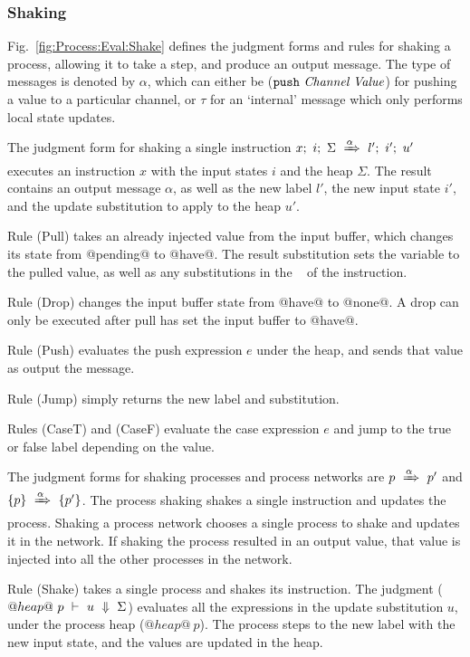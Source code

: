 \subsubsection{Shaking}
Fig.~\ref{fig:Process:Eval:Shake} defines the judgment forms and rules for shaking a process, allowing it to take a step, and produce an output message.
The type of messages is denoted by $\alpha$, which can either be ($\texttt{push}~\textit{Channel}~\textit{Value}$) for pushing a value to a particular channel, or $\tau$ for an `internal' message which only performs local state updates.


The judgment form for shaking a single instruction $x;~i;~\Sigma~\xRightarrow{\alpha}~l';~i';~u'$
executes an instruction $x$ with the input states $i$ and the heap $\Sigma$.
The result contains an output message $\alpha$, as well as the new label $l'$, the new input state $i'$, and the update substitution to apply to the heap $u'$.

Rule (Pull) takes an already injected value from the input buffer, which changes its state from @pending@ to @have@.
The result substitution sets the variable to the pulled value, as well as any substitutions in the \Next~ of the instruction.

Rule (Drop) changes the input buffer state from @have@ to @none@. A drop can only be executed after pull has set the input buffer to @have@.

Rule (Push) evaluates the push expression $e$ under the heap, and sends that value as output the message.

Rule (Jump) simply returns the new label and substitution.

Rules (CaseT) and (CaseF) evaluate the case expression $e$ and jump to the true or false label depending on the value.

The judgment forms for shaking processes and process networks are $p~\xRightarrow{\alpha}~p'$ and $\{ p \}~\xRightarrow{\alpha}~\{ p' \}$.
The process shaking shakes a single instruction and updates the process.
Shaking a process network chooses a single process to shake and updates it in the network.
If shaking the process resulted in an output value, that value is injected into all the other processes in the network.

Rule (Shake) takes a single process and shakes its instruction.
The judgment ($@heap@~p~\vdash~u~\Downarrow~\Sigma$) evaluates all the expressions in the update substitution $u$, under the process heap ($@heap@~p$).
The process steps to the new label with the new input state, and the values are updated in the heap.

